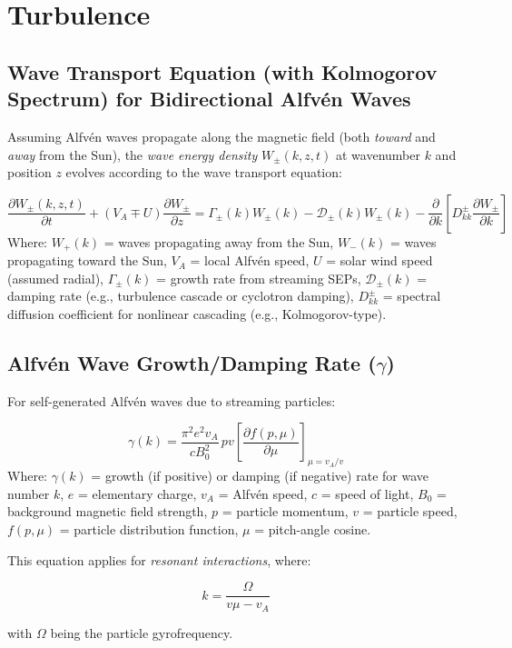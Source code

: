 

\section{Turbulence}


\subsection{Wave Transport Equation (with Kolmogorov Spectrum) for Bidirectional Alfvén Waves}

Assuming Alfvén waves propagate along the magnetic field (both {\it toward} and {\it away} from the Sun), the {\it wave energy density} $W_\pm(k, z, t)$ at wavenumber $k$ and position $z$ evolves according to the wave transport equation:

$$
\frac{\partial W_\pm(k, z, t)}{\partial t}
+ \left( V_A \mp U \right) \frac{\partial W_\pm}{\partial z}
= \Gamma_\pm(k) W_\pm(k) - \mathcal{D}_\pm(k) W_\pm(k) - \frac{\partial}{\partial k} \left[ D_{kk}^\pm \frac{\partial W_\pm}{\partial k} \right]
$$
Where: $W_+(k)$ = waves propagating away from the Sun, 
 $W_-(k)$ = waves propagating toward the Sun, 
 $V_A$ = local Alfvén speed, 
 $U$ = solar wind speed (assumed radial), 
 $\Gamma_\pm(k)$ = growth rate from streaming SEPs, 
 $\mathcal{D}_\pm(k)$ = damping rate (e.g., turbulence cascade or cyclotron damping), 
 $D_{kk}^\pm$ = spectral diffusion coefficient for nonlinear cascading (e.g., Kolmogorov-type). 


\subsection{Alfvén Wave Growth/Damping Rate ($\gamma$)}

For self-generated Alfvén waves due to streaming particles:

$$
\gamma(k) = \frac{\pi^2 e^2 v_A}{c B_0^2} \, p v \left[ \frac{\partial f(p, \mu)}{\partial \mu} \right]_{\mu = v_A/v}
$$
Where:
 $\gamma(k)$ = growth (if positive) or damping (if negative) rate for wave number $k$,
 $e$ = elementary charge,
 $v_A$ = Alfvén speed,
 $c$ = speed of light,
 $B_0$ = background magnetic field strength,
 $p$ = particle momentum,
 $v$ = particle speed,
 $f(p, \mu)$ = particle distribution function,
 $\mu$ = pitch-angle cosine.

This equation applies for {\it resonant interactions}, where:

$$
k = \frac{\Omega}{v \mu - v_A}
$$

with $\Omega$ being the particle gyrofrequency.



